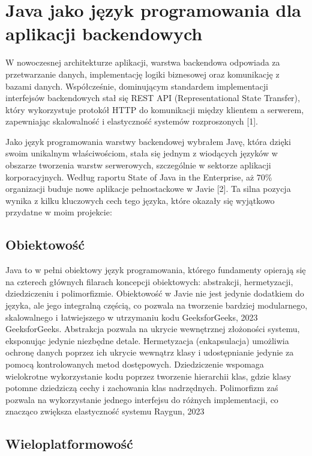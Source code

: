 \documentclass[a4paper,12pt,openany]{book}
\begin{document}
\section{Java jako język programowania dla aplikacji backendowych}

W nowoczesnej architekturze aplikacji, warstwa backendowa odpowiada za przetwarzanie danych, implementację logiki biznesowej oraz komunikację z bazami danych. Współcześnie, dominującym standardem implementacji interfejsów backendowych stał się REST API (Representational State Transfer), który wykorzystuje protokół HTTP do komunikacji między klientem a serwerem, zapewniając skalowalność i elastyczność systemów rozproszonych [1].

Jako język programowania warstwy backendowej wybrałem Javę, która dzięki swoim unikalnym właściwościom, stała się jednym z wiodących języków w obszarze tworzenia warstw serwerowych, szczególnie w sektorze aplikacji korporacyjnych. Według raportu State of Java in the Enterprise, aż 70\% organizacji buduje nowe aplikacje pełnostackowe w Javie [2]. Ta silna pozycja wynika z kilku kluczowych cech tego języka, które okazały się wyjątkowo przydatne w moim projekcie:

\subsection*{Obiektowość}

Java to w pełni obiektowy język programowania, którego fundamenty opierają się na czterech głównych filarach koncepcji obiektowych: abstrakcji, hermetyzacji, dziedziczeniu i polimorfizmie. Obiektowość w Javie nie jest jedynie dodatkiem do języka, ale jego integralną częścią, co pozwala na tworzenie bardziej modularnego, skalowalnego i łatwiejszego w utrzymaniu kodu GeeksforGeeks, 2023 GeeksforGeeks.
Abstrakcja pozwala na ukrycie wewnętrznej złożoności systemu, eksponując jedynie niezbędne detale. Hermetyzacja (enkapsulacja) umożliwia ochronę danych poprzez ich ukrycie wewnątrz klasy i udostępnianie jedynie za pomocą kontrolowanych metod dostępowych. Dziedziczenie wspomaga wielokrotne wykorzystanie kodu poprzez tworzenie hierarchii klas, gdzie klasy potomne dziedziczą cechy i zachowania klas nadrzędnych. Polimorfizm zaś pozwala na wykorzystanie jednego interfejsu do różnych implementacji, co znacząco zwiększa elastyczność systemu Raygun, 2023

\subsection*{Wieloplatformowość}
\end{document}
